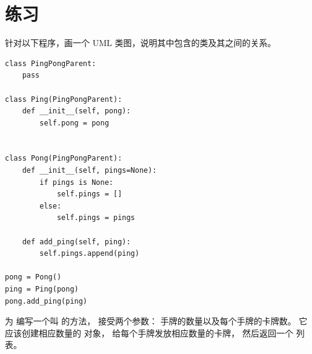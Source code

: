 \section{练习}

\begin{exercise}

针对以下程序，画一个 UML 类图，说明其中包含的类及其之间的关系。

\begin{lstlisting}
class PingPongParent:
    pass

class Ping(PingPongParent):
    def __init__(self, pong):
        self.pong = pong


class Pong(PingPongParent):
    def __init__(self, pings=None):
        if pings is None:
            self.pings = []
        else:
            self.pings = pings

    def add_ping(self, ping):
        self.pings.append(ping)

pong = Pong()
ping = Ping(pong)
pong.add_ping(ping)
\end{lstlisting}

\end{exercise}


\begin{exercise}

为  编写一个叫  的方法， 接受两个参数： 手牌的数量以及每个手牌的卡牌数。  
它应该创建相应数量的  对象， 给每个手牌发放相应数量的卡牌， 
然后返回一个  列表。
\end{exercise}


